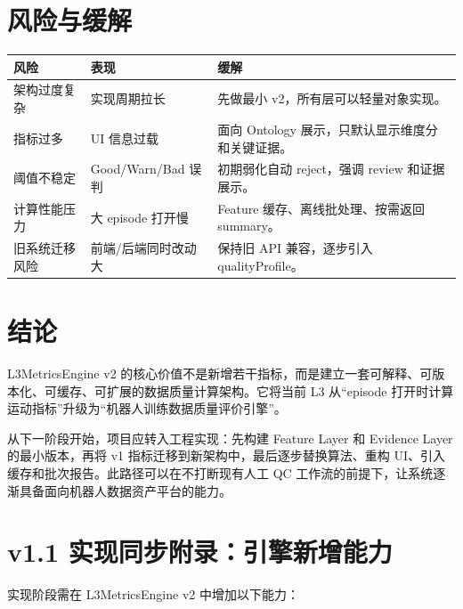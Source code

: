 \documentclass[UTF8,zihao=-4]{ctexart}
\begin{document}
\section{风险与缓解}

\begin{longtable}{L{4cm} L{4cm} L{5.8cm}}
\toprule
风险 & 表现 & 缓解 \\
\midrule
架构过度复杂 & 实现周期拉长 & 先做最小 v2，所有层可以轻量对象实现。 \\
指标过多 & UI 信息过载 & 面向 Ontology 展示，只默认显示维度分和关键证据。 \\
阈值不稳定 & Good/Warn/Bad 误判 & 初期弱化自动 reject，强调 review 和证据展示。 \\
计算性能压力 & 大 episode 打开慢 & Feature 缓存、离线批处理、按需返回 summary。 \\
旧系统迁移风险 & 前端/后端同时改动大 & 保持旧 API 兼容，逐步引入 qualityProfile。 \\
\bottomrule
\end{longtable}

\section{结论}

L3MetricsEngine v2 的核心价值不是新增若干指标，而是建立一套可解释、可版本化、可缓存、可扩展的数据质量计算架构。它将当前 L3 从“episode 打开时计算运动指标”升级为“机器人训练数据质量评价引擎”。

从下一阶段开始，项目应转入工程实现：先构建 Feature Layer 和 Evidence Layer 的最小版本，再将 v1 指标迁移到新架构中，最后逐步替换算法、重构 UI、引入缓存和批次报告。此路径可以在不打断现有人工 QC 工作流的前提下，让系统逐渐具备面向机器人数据资产平台的能力。


\newpage
\section*{v1.1 实现同步附录：引擎新增能力}

实现阶段需在 L3MetricsEngine v2 中增加以下能力：
\end{document}
